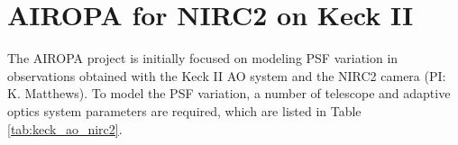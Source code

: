 \section{AIROPA for NIRC2 on Keck II}

The AIROPA project is initially focused on modeling PSF variation in
observations obtained with the Keck II AO system \cite{Wizinowich:2006,vanDam:2006} 
and the NIRC2 camera (PI: K. Matthews). To model the PSF variation, a
number of telescope and adaptive optics system parameters are
required, which are listed in Table \ref{tab:keck_ao_nirc2}.





